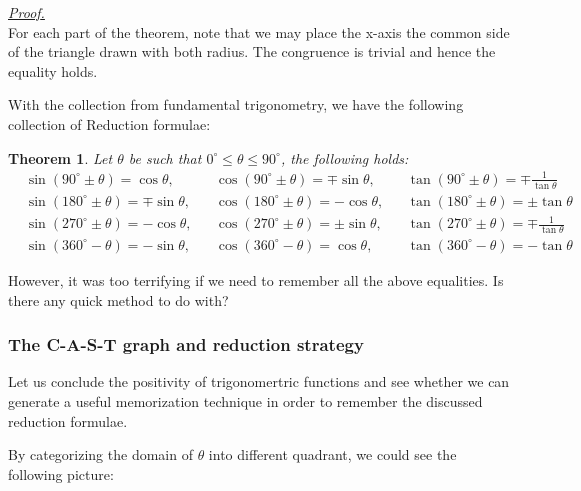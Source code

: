 \documentclass[12pt]{article}
\newtheorem*{theorem}{Theorem}
\renewenvironment{proof}[1][Proof]{\begin{snugshade*} \underline{\textit{{#1}.}}\\}{\hfill \qedsymbol \end{snugshade*}}
\begin{document}
    \begin{proof}
        For each part of the theorem, note that we may place the x-axis the common side of the triangle drawn with both radius. The congruence is trivial and hence the equality holds.
    \end{proof}

    With the collection from fundamental trigonometry, we have the following collection of Reduction formulae:

    \begin{theorem}
        Let $\theta$ be such that $0^\circ\leq \theta\leq 90^\circ$, the following holds: \begin{align*}
            &\sin(90^\circ\pm\theta)=\cos{\theta},&&\cos(90^\circ\pm\theta)=\mp\sin{\theta},&&\tan(90^\circ\pm\theta)=\mp\frac{1}{\tan{\theta}}\\
            &\sin(180^\circ\pm\theta)=\mp\sin{\theta},&&\cos(180^\circ\pm\theta)=-\cos{\theta},&&\tan(180^\circ\pm\theta)=\pm\tan{\theta}\\
            &\sin(270^\circ\pm\theta)=-\cos{\theta},&&\cos(270^\circ\pm\theta)=\pm\sin{\theta},&&\tan(270^\circ\pm\theta)=\mp\frac{1}{\tan{\theta}}\\
            &\sin(360^\circ - \theta)=-\sin{\theta},&&\cos(360^\circ - \theta)=\cos{\theta},&&\tan(360^\circ - \theta)=-\tan{\theta}
        \end{align*}
    \end{theorem}

    However, it was too terrifying if we need to remember all the above equalities. Is there any quick method to do with?

    \subsubsection*{The C-A-S-T graph and reduction strategy}

    Let us conclude the positivity of trigonomertric functions and see whether we can generate a useful memorization technique in order to remember the discussed reduction formulae.

    By categorizing the domain of $\theta$ into different quadrant, we could see the following picture:
\end{document}
